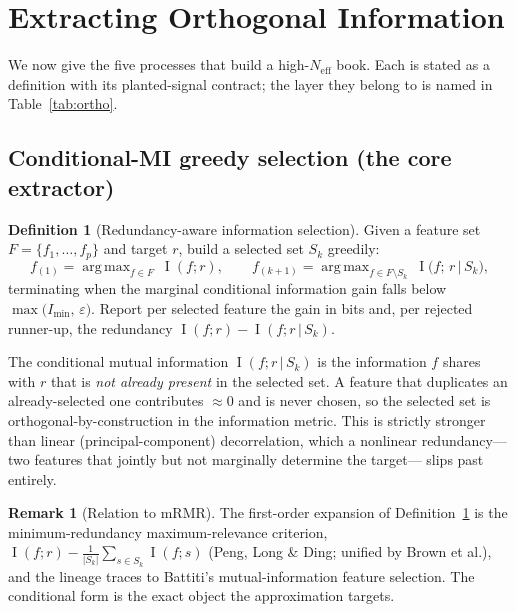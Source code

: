 \documentclass[11pt,a4paper]{article}
\theoremstyle{definition}
\newtheorem{definition}{Definition}[section]
\newtheorem{remark}{Remark}[section]
\theoremstyle{plain}
\newcommand{\Neff}{N_{\mathrm{eff}}}
\newcommand{\given}{\,\vert\,}
\DeclareMathOperator{\MI}{I}
\DeclareMathOperator*{\argmax}{arg\,max}
\begin{document}
\section{Extracting Orthogonal Information}
\label{sec:ortho}

We now give the five processes that build a high-$\Neff$ book. Each is stated as a definition with
its planted-signal contract; the layer they belong to is named in Table~\ref{tab:ortho}.

\subsection{Conditional-MI greedy selection (the core extractor)}

\begin{definition}[Redundancy-aware information selection]
\label{def:cmi}
Given a feature set $F=\{f_1,\dots,f_p\}$ and target $r$, build a selected set $S_k$ greedily:
\[
   f_{(1)} = \argmax_{f\in F}\ \MI(f;r),
   \qquad
   f_{(k+1)} = \argmax_{f\in F\setminus S_k}\ \MI\big(f;\,r \given S_k\big),
\]
terminating when the marginal conditional information gain falls below
$\max\!\big(I_{\min},\,\varepsilon\big)$. Report per selected feature the gain in bits and, per
rejected runner-up, the redundancy $\MI(f;r)-\MI(f;r\given S_k)$.
\end{definition}

The conditional mutual information $\MI(f;r\given S_k)$ is the information $f$ shares with $r$ that
is \emph{not already present} in the selected set. A feature that duplicates an already-selected one
contributes $\approx 0$ and is never chosen, so the selected set is orthogonal-by-construction in
the information metric. This is strictly stronger than linear (principal-component) decorrelation,
which a nonlinear redundancy---two features that jointly but not marginally determine the target---
slips past entirely.

\begin{remark}[Relation to mRMR]
The first-order expansion of Definition~\ref{def:cmi} is the minimum-redundancy maximum-relevance
criterion, $\MI(f;r)-\tfrac{1}{|S_k|}\sum_{s\in S_k}\MI(f;s)$ (Peng, Long \& Ding; unified by Brown
et al.), and the lineage traces to Battiti's mutual-information feature selection. The conditional
form is the exact object the approximation targets.
\end{remark}
\end{document}
